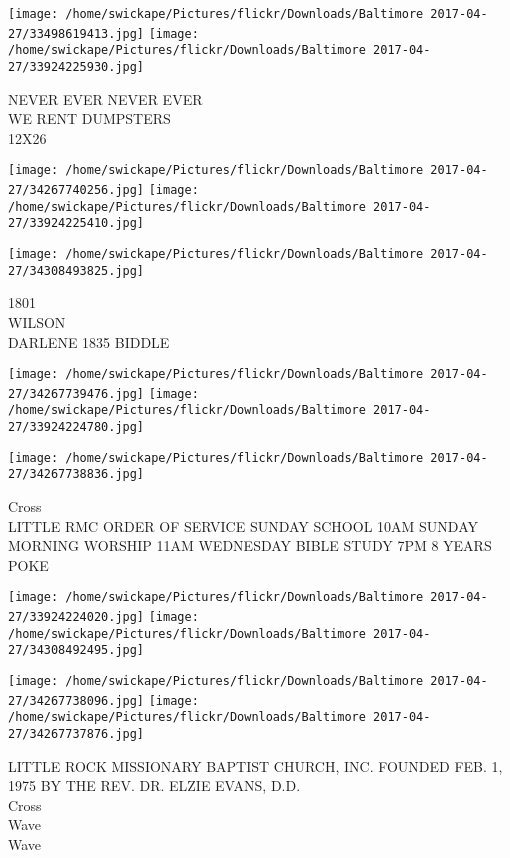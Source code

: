 \documentclass[10pt,letterpaper]{article}
\begin{document}
\vspace{0.25in}
\texttt{[image: /home/swickape/Pictures/flickr/Downloads/Baltimore 2017-04-27/33498619413.jpg]}
\texttt{[image: /home/swickape/Pictures/flickr/Downloads/Baltimore 2017-04-27/33924225930.jpg]}

NEVER EVER NEVER EVER\\
WE RENT DUMPSTERS\\
12X26
\pagebreak

\texttt{[image: /home/swickape/Pictures/flickr/Downloads/Baltimore 2017-04-27/34267740256.jpg]}
\texttt{[image: /home/swickape/Pictures/flickr/Downloads/Baltimore 2017-04-27/33924225410.jpg]}

\vspace{0.25in}
\texttt{[image: /home/swickape/Pictures/flickr/Downloads/Baltimore 2017-04-27/34308493825.jpg]}

1801\\
WILSON\\
DARLENE 1835 BIDDLE
\pagebreak

\texttt{[image: /home/swickape/Pictures/flickr/Downloads/Baltimore 2017-04-27/34267739476.jpg]}
\texttt{[image: /home/swickape/Pictures/flickr/Downloads/Baltimore 2017-04-27/33924224780.jpg]}

\vspace{0.25in}
\texttt{[image: /home/swickape/Pictures/flickr/Downloads/Baltimore 2017-04-27/34267738836.jpg]}

Cross\\
LITTLE RMC ORDER OF SERVICE SUNDAY SCHOOL 10AM SUNDAY MORNING WORSHIP 11AM WEDNESDAY BIBLE STUDY 7PM 8 YEARS\\
POKE
\pagebreak

\texttt{[image: /home/swickape/Pictures/flickr/Downloads/Baltimore 2017-04-27/33924224020.jpg]}
\texttt{[image: /home/swickape/Pictures/flickr/Downloads/Baltimore 2017-04-27/34308492495.jpg]}

\texttt{[image: /home/swickape/Pictures/flickr/Downloads/Baltimore 2017-04-27/34267738096.jpg]}
\texttt{[image: /home/swickape/Pictures/flickr/Downloads/Baltimore 2017-04-27/34267737876.jpg]}

LITTLE ROCK MISSIONARY BAPTIST CHURCH, INC. FOUNDED FEB. 1, 1975 BY THE REV. DR. ELZIE EVANS, D.D.\\
Cross\\
Wave\\
Wave
\pagebreak
\end{document}
